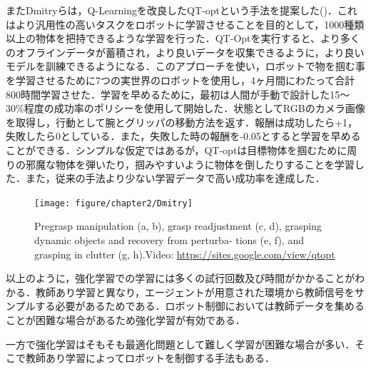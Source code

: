 またDmitryらは，Q-Learningを改良したQT-optという手法を提案した\cite{Dmitry2018}()．これはより汎用性の高いタスクをロボットに学習させることを目的として，1000種類以上の物体を把持できるような学習を行った．QT-Optを実行すると、より多くのオフラインデータが蓄積され，より良いデータを収集できるように，より良いモデルを訓練できるようになる．このアプローチを使い，ロボットで物を掴む事を学習させるために7つの実世界のロボットを使用し，4ヶ月間にわたって合計800時間学習させた．学習を早めるために，最初は人間が手動で設計した15～30\%程度の成功率のポリシーを使用して開始した．状態としてRGBのカメラ画像を取得し，行動として腕とグリッパの移動方法を返す．報酬は成功したら+1，失敗したら0としている．また，失敗した時の報酬を-0.05とすると学習を早めることができる．シンプルな仮定ではあるが，QT-optは目標物体を掴むために周りの邪魔な物体を弾いたり，掴みやすいように物体を倒したりすることを学習した．また，従来の手法より少ない学習データで高い成功率を達成した．

\begin{figure}
    \centering
    \texttt{[image: figure/chapter2/Dmitry]}
    \caption[Pregrasp manipulation (a, b), grasp readjustment (c, d), grasping dynamic objects and recovery from perturba- tions (e, f), and grasping in clutter (g, h).]{Pregrasp manipulation (a, b), grasp readjustment (c, d), grasping dynamic objects and recovery from perturba- tions (e, f), and grasping in clutter (g, h)\cite{Dmitry2018}.Video: \url{https://sites.google.com/view/qtopt}}
    \label{fig:Dmitry}
\end{figure}

以上のように，強化学習での学習には多くの試行回数及び時間がかかることがわかる．教師あり学習と異なり，エージェントが用意された環境から教師信号をサンプルする必要があるためである．ロボット制御においては教師データを集めることが困難な場合があるため強化学習が有効である．

一方で強化学習はそもそも最適化問題として難しく学習が困難な場合が多い．そこで教師あり学習によってロボットを制御する手法もある．

